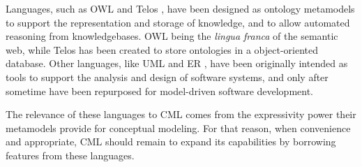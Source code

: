 Languages, such as OWL \cite{owl2} and Telos \cite{telos}, have been designed as ontology metamodels
to support the representation and storage of knowledge,
and to allow automated reasoning from knowledgebases.
OWL being the \emph{lingua franca} of the semantic web,
while Telos has been created to store ontologies in a object-oriented database.
Other languages, like UML \cite{uml} and ER \cite{er}, have been originally intended as tools to support the analysis and design of software systems, and only after sometime have been repurposed for model-driven software development.

The relevance of these languages to CML comes from the expressivity power their metamodels provide for conceptual modeling. For that reason, when convenience and appropriate, CML should remain to expand its capabilities by borrowing features from these languages.
